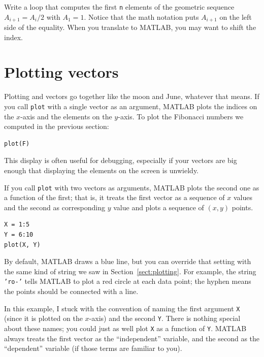 \documentclass[
]{book}
\begin{document}
\begin{ex}
Write a loop that computes the first {\tt n} elements
of the geometric sequence $A_{i+1} = A_i/2$ with $A_1 = 1$.  Notice that
the math notation puts $A_{i+1}$ on the left side of the equality.
When you translate to MATLAB, you may want to shift the index.
\end{ex}


\section{Plotting vectors}

Plotting and vectors go together like the moon and June, whatever that
means.  If you call {\tt plot} with a single vector as an argument,
MATLAB plots the indices on the $x$-axis and the elements on the
$y$-axis.  To plot the Fibonacci numbers we computed in the previous
section:

\begin{verbatim}
plot(F)
\end{verbatim}

This display is often useful for debugging, especially
if your vectors are big enough that displaying the elements on
the screen is unwieldy.

If you call {\tt plot} with two vectors as arguments, MATLAB plots
the second one as a function of the first; that is, it treats
the first vector as a sequence of $x$ values and the second as
corresponding $y$ value and plots a sequence of $(x, y)$ points.

\begin{verbatim}
X = 1:5
Y = 6:10
plot(X, Y)
\end{verbatim}

By default, MATLAB draws a blue line, but you can override that
setting with the same kind of string we saw in Section~\ref{sect:plotting}.
For example, the string {\tt 'ro-'} tells MATLAB to plot a red circle
at each data point; the hyphen means the points should be connected
with a line.

In this example, I stuck with the convention of naming the first
argument {\tt X} (since it is plotted on the $x$-axis) and the
second {\tt Y}.  There is nothing special about these names;
you could just as well plot {\tt X} as a function of {\tt Y}.
MATLAB always treats the first vector as the ``independent''
variable, and the second as the ``dependent'' variable (if those
terms are familiar to you).
\end{document}
